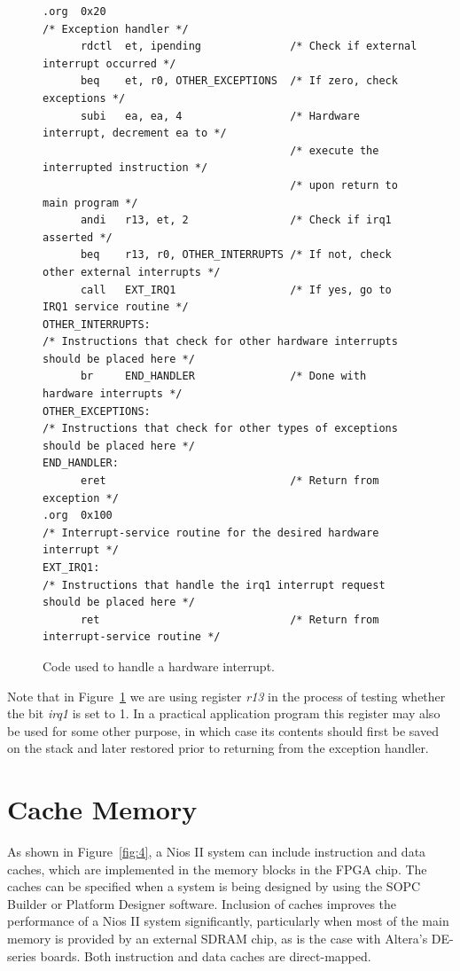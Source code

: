 \documentclass[11pt, twoside, pdftex]{article}
\begin{document}
\begin{figure}[H]
\begin{lstlisting}[style=defaultNiosStyle] %%%\begin{singlespace}
.org  0x20
/* Exception handler */
      rdctl  et, ipending              /* Check if external interrupt occurred */
      beq    et, r0, OTHER_EXCEPTIONS  /* If zero, check exceptions */
      subi   ea, ea, 4                 /* Hardware interrupt, decrement ea to */  
                                       /* execute the interrupted instruction */
                                       /* upon return to main program */ 
      andi   r13, et, 2                /* Check if irq1 asserted */
      beq    r13, r0, OTHER_INTERRUPTS /* If not, check other external interrupts */
      call   EXT_IRQ1                  /* If yes, go to IRQ1 service routine */
OTHER_INTERRUPTS:
/* Instructions that check for other hardware interrupts should be placed here */
      br     END_HANDLER               /* Done with hardware interrupts */
OTHER_EXCEPTIONS:
/* Instructions that check for other types of exceptions should be placed here */
END_HANDLER:
      eret                             /* Return from exception */
.org  0x100
/* Interrupt-service routine for the desired hardware interrupt */
EXT_IRQ1:
/* Instructions that handle the irq1 interrupt request should be placed here */
      ret                              /* Return from interrupt-service routine */
\end{lstlisting}
	\caption{Code used to handle a hardware interrupt.}
	\label{fig:7}
\end{figure}

Note that in Figure~\ref{fig:7} we are using register {\it r13} in the process of testing 
whether the bit {\it irq1} is set to 1. In a practical application program this
register may also be used for some other purpose, in which case its contents
should first be saved on the stack and later restored prior to returning
from the exception handler.

\noindent


\section{Cache Memory}

As shown in Figure~\ref{fig:4}, a Nios II system can include instruction and data caches,
which are implemented in the memory blocks in the FPGA chip.
The caches can be specified when a system is being designed by using the SOPC Builder or Platform Designer
software. Inclusion of caches improves the performance of a Nios II system significantly,
particularly when most of the main memory is provided by an external SDRAM chip, as is 
the case with Altera's DE-series boards. Both instruction and data caches are direct-mapped.
 
\end{document}
